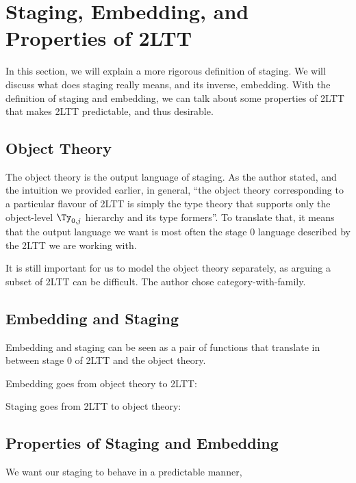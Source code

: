 \section{Staging, Embedding, and Properties of 2LTT}
In this section, we will explain a more rigorous definition of staging. We will discuss what does staging really means, and its inverse, embedding. With the definition of staging and embedding, we can talk about some properties of 2LTT that makes 2LTT predictable, and thus desirable.

\subsection{}









\subsection{Object Theory}
The object theory is the output language of staging. As the author stated, and the intuition we provided earlier, in general, ``the object theory corresponding to a particular flavour of 2LTT is simply the type theory that supports only the object-level $\Ty_{0, j}$ hierarchy and its type formers''. To translate that, it means that the output language we want is most often the stage 0 language described by the 2LTT we are working with. 

It is still important for us to model the object theory separately, as arguing a subset of 2LTT can be difficult. The author chose category-with-family.


\subsection{Embedding and Staging}
Embedding and staging can be seen as a pair of functions that translate in between stage 0 of 2LTT and the object theory.

Embedding goes from object theory to 2LTT:

Staging goes from 2LTT to object theory:

\subsection{Properties of Staging and Embedding}
We want our staging to behave in a predictable manner, 


